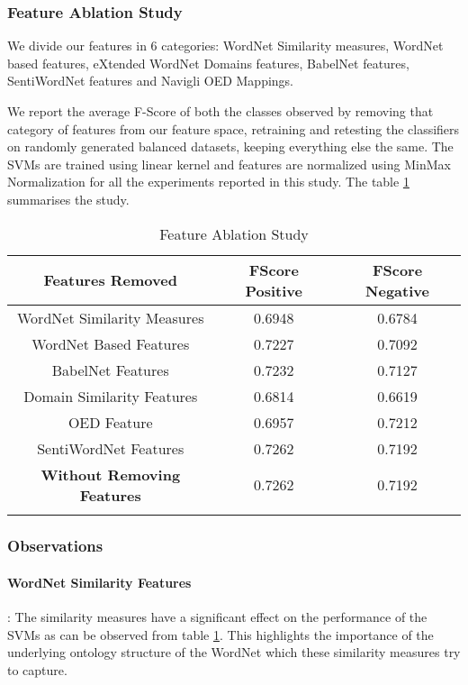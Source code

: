 \subsubsection{Feature Ablation Study}
We divide our features in 6 categories: WordNet Similarity measures, WordNet based features, eXtended WordNet Domains features, BabelNet features, SentiWordNet features and Navigli OED Mappings. 

We report the average F-Score of both the classes observed by removing that category of features from our feature space, retraining and retesting the classifiers on randomly generated balanced datasets, keeping everything else the same. The SVMs are trained using linear kernel and features are normalized using MinMax Normalization for all the experiments reported in this study. The table \ref{tab:nounEvalFeatureAblation} summarises the study.

\begin{center}
\begin{longtable}{| c | c | c |}  
\hline
\textbf{Features Removed} & \textbf{FScore Positive} & \textbf{FScore Negative} \\ \hline
WordNet Similarity Measures & 0.6948 & 0.6784 \\ \hline
WordNet Based Features & 0.7227 & 0.7092 \\ \hline
BabelNet Features & 0.7232 & 0.7127 \\ \hline
Domain Similarity Features & 0.6814 & 0.6619 \\ \hline
OED Feature & 0.6957 & 0.7212 \\ \hline
SentiWordNet Features & 0.7262 & 0.7192 \\ \hline
\hline
\textbf{Without Removing Features} & 0.7262 & 0.7192 \\ \hline
\caption{Feature Ablation Study}
\label{tab:nounEvalFeatureAblation}
\end{longtable}
\end{center}

\subsubsection{Observations}

\paragraph{WordNet Similarity Features}: 
The similarity measures have a significant effect on the performance of the SVMs as can be observed from table \ref{tab:nounEvalFeatureAblation}. This highlights the importance of the underlying ontology structure of the WordNet which these similarity measures try to capture.

